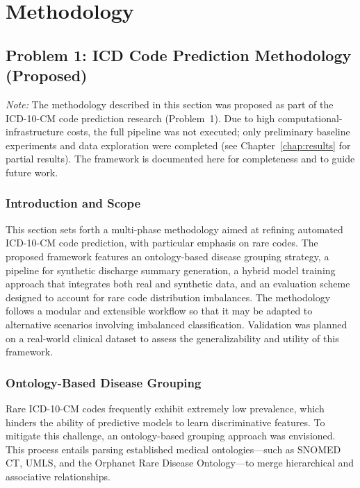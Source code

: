 \chapter{Methodology}\label{chap:methods}


\section{Problem 1: ICD Code Prediction Methodology (Proposed)}\label{sec:p1:methodology}

\emph{Note:} The methodology described in this section was proposed as part of the ICD-10-CM code prediction research (Problem~1). Due to high computational-infrastructure costs, the full pipeline was not executed; only preliminary baseline experiments and data exploration were completed (see Chapter~\ref{chap:results} for partial results). The framework is documented here for completeness and to guide future work.

\subsection{Introduction and Scope}\label{sec:p1:meth_intro}
This section sets forth a multi-phase methodology aimed at refining automated ICD-10-CM code prediction, with particular emphasis on rare codes. The proposed framework features an ontology-based disease grouping strategy, a pipeline for synthetic discharge summary generation, a hybrid model training approach that integrates both real and synthetic data, and an evaluation scheme designed to account for rare code distribution imbalances. The methodology follows a modular and extensible workflow so that it may be adapted to alternative scenarios involving imbalanced classification. Validation was planned on a real-world clinical dataset to assess the generalizability and utility of this framework.

\subsection{Ontology-Based Disease Grouping}\label{sec:p1:ontology_grouping}
Rare ICD-10-CM codes frequently exhibit extremely low prevalence, which hinders the ability of predictive models to learn discriminative features. To mitigate this challenge, an ontology-based grouping approach was envisioned. This process entails parsing established medical ontologies---such as SNOMED CT, UMLS, and the Orphanet Rare Disease Ontology---to merge hierarchical and associative relationships.

